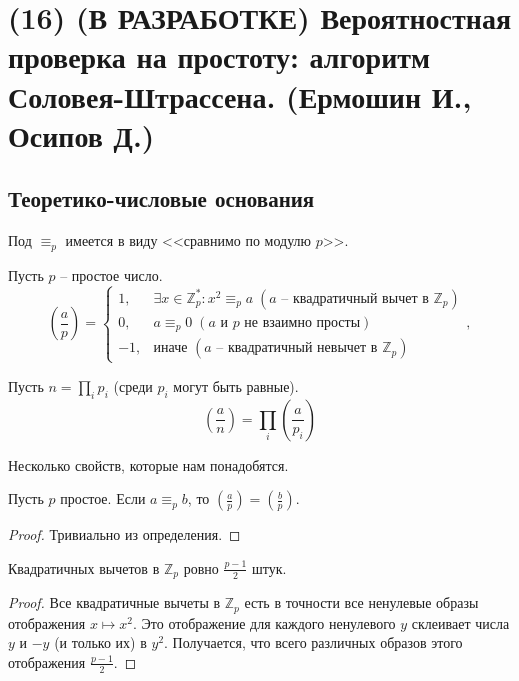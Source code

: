 \newcommand{\divisible}{\mathop{\raisebox{-2pt}{\vdots}}}
\section{(16) (В РАЗРАБОТКЕ) Вероятностная проверка на простоту: алгоритм Соловея-Штрассена. (Ермошин И., Осипов Д.)}

\subsection{Теоретико-числовые основания}
Под $\equiv_p$ имеется в виду <<сравнимо по модулю $p$>>.
\begin{definition*} Пусть $p$ -- простое число.
$$(\frac{a}{p}) = \begin{cases} 
1,  & \exists x\in\mathbb{Z}_p^*: x^2\equiv_p a \; (a \text{~-- квадратичный вычет в } \mathbb Z_p)\\
0,  & a\equiv_p0 \; (a \text{ и } p \text{ не взаимно просты})\\
-1, & \text{иначе } (a \text{~-- квадратичный невычет в } \mathbb Z_p)
\end{cases},$$
\end{definition*}

\begin{definition*} Пусть $n = \prod_i p_i$ (среди $p_i$ могут быть равные).
$$(\frac{a}{n})=\prod_i (\frac{a}{p_i})$$
\end{definition*}

Несколько свойств, которые нам понадобятся.

\begin{lemma} \hypertarget{aequivb}{}
Пусть $p$ простое. Если $a \equiv_p b$, то $(\frac{a}{p}) = (\frac{b}{p})$.
\end{lemma}
\begin{proof}
Тривиально из определения.
\end{proof}

\begin{lemma} \hypertarget{qresiduelemma}{} Квадратичных вычетов в $\mathbb Z_p$ ровно $\frac{p-1}{2}$ штук.
\end{lemma}
\begin{proof}
Все квадратичные вычеты в $\mathbb Z_p$ есть в точности все ненулевые образы отображения $x \mapsto x^2$. Это отображение для каждого ненулевого $y$ склеивает числа $y$ и $-y$ (и только их) в $y^2$. Получается, что всего различных образов этого отображения $\frac{p-1}{2}$.
\end{proof}

